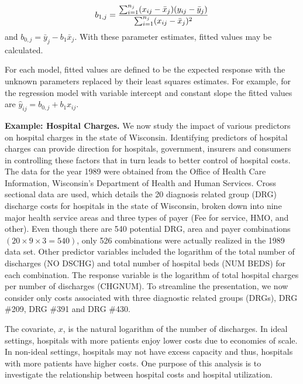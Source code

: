 \begin{equation*}
b_{1,j}=\frac{\sum_{i=1}^{n_j}(x_{ij}-\bar{x}_j)(y_{ij}-\bar{y}_j)}{%
\sum_{i=1}^{n_j}(x_{ij}-\bar{x}_j)^2}
\end{equation*}
and $b_{0,j}=\bar{y}_j-b_1\bar{x}_j$. With these parameter
estimates, fitted values may be calculated.

For each model, fitted values are defined to be the expected response with
the unknown parameters replaced by their least squares estimates.
For example, for the regression model with variable intercept and
constant slope the fitted values are
$\hat{y}_{ij}=b_{0,j}+b_1x_{ij}$.

\linejed



\textbf{Example: Hospital Charges.} We
now study the impact of various predictors on hospital charges in
the state of Wisconsin. Identifying predictors of hospital charges
can provide direction for hospitals, government, insurers and
consumers in controlling these factors that in turn leads to better
control of hospital costs. The data for the year 1989 were obtained
from the Office of Health Care Information, Wisconsin's Department
of Health and Human Services. Cross sectional data are used, which
details the 20 diagnosis related group (DRG) discharge costs for
hospitals in the state of Wisconsin, broken down into nine major
health service areas and three types of payer (Fee for service, HMO,
and other). Even though there are 540 potential DRG, area and payer
combinations $(20\times 9\times 3=540)$, only 526 combinations were
actually realized in the 1989 data set. Other predictor variables
included the logarithm of the total number of discharges (NO DSCHG)
and total number of hospital beds (NUM BEDS) for each combination.
The response variable is the logarithm of total hospital charges per
number of discharges (CHGNUM). To streamline the presentation, we
now consider only costs associated with three diagnostic related
groups (DRGs), DRG \#209, DRG \#391 and DRG \#430.

The covariate, $x$, is the natural logarithm of the number of
discharges. In ideal settings, hospitals with more patients enjoy
lower costs due to economies of scale. In non-ideal settings,
hospitals may not have excess capacity and thus, hospitals with more
patients have higher costs. One purpose of this analysis is to
investigate the relationship between hospital costs and hospital
utilization.

